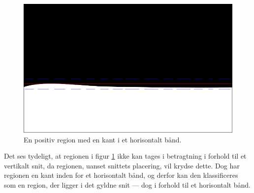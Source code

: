 {\begin{figure}[H]
    \begin{center}
        \includegraphics[scale=\imgscale,angle=0]{afsnit/vores_implementation/billeder/naiv_algoritme/naiv_horiz_positiv_blob_1}
    \end{center}
    \caption[Positiv horisontal region]{En positiv region med en
    kant i et horisontalt bånd.}
    \label{pos_horiz_naiv_margin_1}
\end{figure}
Det ses tydeligt, at regionen i figur \ref{pos_horiz_naiv_margin_1} ikke
kan tages i betragtning i forhold til et vertikalt snit, da regionen,
uanset snittets placering, vil krydse dette.  Dog har regionen en kant
inden for et horisontalt bånd, og derfor kan den klassificeres som en
region, der ligger i det gyldne snit --- dog i forhold til et
horisontalt bånd.

}
